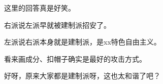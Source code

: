 \begin{zhihuanswer}
这里的回答真是好笑。

右派说左派早就被建制派招安了。

左派说右派本身就是建制派，是xx特色自由主义。

看来画成分、扣帽子确实是最好的攻击方式。

好呀，原来大家都是建制派呀，这也太和谐了吧？
\end{zhihuanswer}
